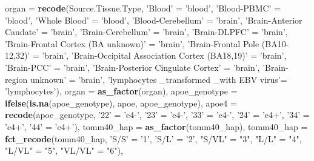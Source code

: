 \documentclass[]{book}
\newenvironment{Shaded}{\begin{snugshade}}{\end{snugshade}}
\newcommand{\DataTypeTok}[1]{\textcolor[rgb]{0.13,0.29,0.53}{#1}}
\newcommand{\KeywordTok}[1]{\textcolor[rgb]{0.13,0.29,0.53}{\textbf{#1}}}
\newcommand{\NormalTok}[1]{#1}
\newcommand{\StringTok}[1]{\textcolor[rgb]{0.31,0.60,0.02}{#1}}
\begin{document}
\begin{Shaded}
\begin{Highlighting}[]
{{{{{{{{{{{{{{{{{{{{{{        \DataTypeTok{organ =} \KeywordTok{recode}\NormalTok{(Source.Tissue.Type, }\StringTok{'Blood'}\NormalTok{ =}\StringTok{ 'blood'}\NormalTok{, }\StringTok{'Blood-PBMC'}\NormalTok{ =}\StringTok{ 'blood'}\NormalTok{, }\StringTok{'Whole Blood'}\NormalTok{ =}\StringTok{ 'blood'}\NormalTok{, }
                       \StringTok{'Blood-Cerebellum'}\NormalTok{ =}\StringTok{ 'brain'}\NormalTok{,  }\StringTok{'Brain-Anterior Caudate'}\NormalTok{ =}\StringTok{ 'brain'}\NormalTok{,}
                       \StringTok{'Brain-Cerebellum'}\NormalTok{ =}\StringTok{ 'brain'}\NormalTok{, }\StringTok{'Brain-DLPFC'}\NormalTok{ =}\StringTok{ 'brain'}\NormalTok{, }
                       \StringTok{'Brain-Frontal Cortex (BA unknown)'}\NormalTok{ =}\StringTok{ 'brain'}\NormalTok{, }
                       \StringTok{'Brain-Frontal Pole (BA10-12,32)'}\NormalTok{ =}\StringTok{ 'brain'}\NormalTok{, }
                       \StringTok{'Brain-Occipital Association Cortex (BA18,19)'}\NormalTok{ =}\StringTok{ 'brain'}\NormalTok{, }
                       \StringTok{'Brain-PCC'}\NormalTok{ =}\StringTok{ 'brain'}\NormalTok{, }\StringTok{'Brain-Posterior Cingulate Cortex'}\NormalTok{ =}\StringTok{ 'brain'}\NormalTok{, }
                       \StringTok{'Brain-region unknown'}\NormalTok{ =}\StringTok{ 'brain'}\NormalTok{, }
                       \StringTok{'lymphocytes _transformed _with EBV virus'}\NormalTok{=}\StringTok{ 'lymphocytes'}\NormalTok{),}
        \DataTypeTok{organ =} \KeywordTok{as_factor}\NormalTok{(organ),}
        \DataTypeTok{apoe_genotype =} \KeywordTok{ifelse}\NormalTok{(}\KeywordTok{is.na}\NormalTok{(apoe_genotype), apoe, apoe_genotype),}
        \DataTypeTok{apoe4 =} \KeywordTok{recode}\NormalTok{(apoe_genotype, }\StringTok{'22'}\NormalTok{ =}\StringTok{ 'e4-'}\NormalTok{, }\StringTok{'23'}\NormalTok{ =}\StringTok{ 'e4-'}\NormalTok{, }\StringTok{'33'}\NormalTok{ =}\StringTok{ 'e4-'}\NormalTok{, }\StringTok{'24'}\NormalTok{ =}\StringTok{ 'e4+'}\NormalTok{, }\StringTok{'34'}\NormalTok{ =}\StringTok{ 'e4+'}\NormalTok{, }\StringTok{'44'}\NormalTok{ =}\StringTok{ 'e4+'}\NormalTok{),}
        \DataTypeTok{tomm40_hap =} \KeywordTok{as_factor}\NormalTok{(tomm40_hap),}
        \DataTypeTok{tomm40_hap =} \KeywordTok{fct_recode}\NormalTok{(tomm40_hap, }\StringTok{'S/S'}\NormalTok{ =}\StringTok{ '1'}\NormalTok{, }\StringTok{'S/L'}\NormalTok{ =}\StringTok{ '2'}\NormalTok{, }\StringTok{"S/VL"}\NormalTok{ =}\StringTok{ "3"}\NormalTok{, }\StringTok{"L/L"}\NormalTok{ =}\StringTok{ "4"}\NormalTok{, }\StringTok{"L/VL"}\NormalTok{ =}\StringTok{ "5"}\NormalTok{, }\StringTok{"VL/VL"}\NormalTok{ =}\StringTok{ "6"}\NormalTok{),}
}}}}}}}}}}}}}}}}}}}}}}
\end{Highlighting}
\end{Shaded}
\end{document}
